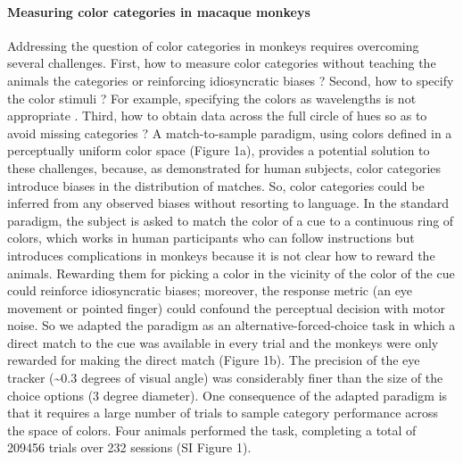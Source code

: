 \paragraph{Measuring color categories in macaque monkeys}

Addressing the question of color categories in monkeys requires overcoming several challenges. First, how to measure color categories without teaching the animals the categories or reinforcing idiosyncratic biases \citep{essock_color_1977,matsuno_color_2004}? Second, how to specify the color stimuli \citep{siuda-krzywicka_biological_2019}? For example, specifying the colors as wavelengths \citep{sandell_color_1979} is not appropriate \citep{davidoff_cross-species_2010}. 
Third, how to obtain data across the full circle of hues so as to avoid missing categories \citep{fagot_cross-species_2006}? A match-to-sample paradigm, using colors defined in a perceptually uniform color space \citep{stockman_colorimetry_2010} (Figure 1a), provides a potential solution to these challenges, because, as demonstrated for human subjects\citep{bae_why_2015}, color categories introduce biases in the distribution of matches. So, color categories could be inferred from any observed biases without resorting to language. In the standard paradigm, the subject is asked to match the color of a cue to a continuous ring of colors, which works in human participants who can follow instructions but introduces complications in monkeys because it is not clear how to reward the animals. Rewarding them for picking a color in the vicinity of the color of the cue could reinforce idiosyncratic biases\citep{panichello_error-correcting_2019}; moreover, the response metric (an eye movement or pointed finger) could confound the perceptual decision with motor noise. So we adapted the paradigm as an alternative-forced-choice task in which a direct match to the cue was available in every trial and the monkeys were only rewarded for making the direct match (Figure 1b). The precision of the eye tracker (\textasciitilde0.3 degrees of visual angle) was considerably finer than the size of the choice options (3 degree diameter). One consequence of the adapted paradigm is that it requires a large number of trials to sample category performance across the space of colors. Four animals performed the task, completing a total of 209456 trials over 232 sessions (SI Figure 1).

